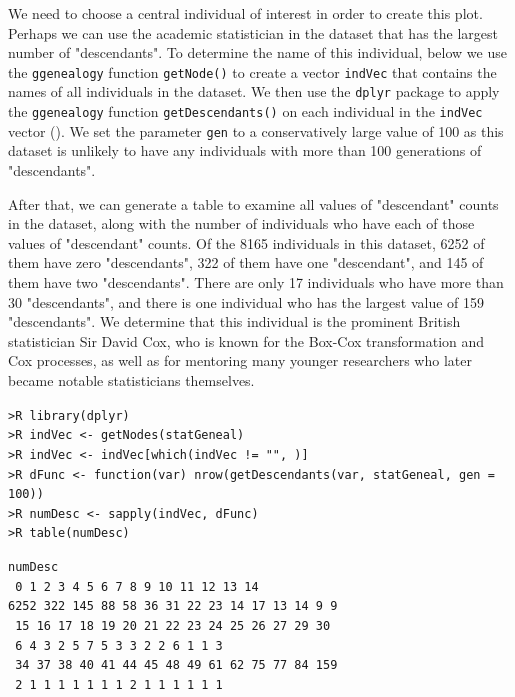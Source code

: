 \documentclass[11pt,a4paper,oldfontcommands,openany]{memoir}
\DeclareRobustCommand{\mybox}[2][gray!15]{%
\begin{tcolorbox}[   %
        breakable,
        left=0pt,
        right=0pt,
        top=0pt,
        bottom=0pt,
        colback=#1,
        colframe=#1,
        width=\dimexpr\textwidth\relax, 
        enlarge left by=0mm,
        boxsep=5pt,
        arc=0pt,outer arc=0pt,
        ]
        #2
\end{tcolorbox}
}
\numberwithin{equation}{section} %
\newcommand{\code}[1]{{\texttt{#1}}}
\newcommand{\pkg}[1]{{\texttt{#1}}}
\begin{document}
We need to choose a central individual of interest in order to create this plot. Perhaps we can use the academic statistician in the dataset that has the largest number of "descendants". To determine the name of this individual, below we use the \pkg{ggenealogy} function \code{getNode()} to create a vector \code{indVec} that contains the names of all individuals in the dataset. We then use the \pkg{dplyr} package to apply the \pkg{ggenealogy} function \code{getDescendants()} on each individual in the \code{indVec} vector (\citealt{dplyr}). We set the parameter \code{gen} to a conservatively large value of 100 as this dataset is unlikely to have any individuals with more than 100 generations of "descendants".

After that, we can generate a table to examine all values of "descendant" counts in the dataset, along with the number of individuals who have each of those values of "descendant" counts. Of the 8165 individuals in this dataset, 6252 of them have zero "descendants", 322 of them have one "descendant", and 145 of them have two "descendants". There are only 17 individuals who have more than 30 "descendants", and there is one individual who has the largest value of 159 "descendants". We determine that this individual is the prominent British statistician Sir David Cox, who is known for the Box-Cox transformation and Cox processes, as well as for mentoring many younger researchers who later became notable statisticians themselves.

\mybox{
\texttt{>R library(dplyr)}\\
\texttt{>R indVec <- getNodes(statGeneal)}\\
\texttt{>R indVec <- indVec[which(indVec != "", )]}\\
\texttt{>R dFunc <- function(var) nrow(getDescendants(var, statGeneal, gen = 100))}\\
\texttt{>R numDesc <- sapply(indVec, dFunc)}\\
\texttt{>R table(numDesc)}
}

\mybox[green!10]{
\texttt{numDesc}\\
\texttt{   0    1    2    3    4    5    6    7    8    9   10   11   12   13   14 }\\
\texttt{6252  322  145   88   58   36   31   22   23   14   17   13   14    9    9 }\\
\texttt{  15   16   17   18   19   20   21   22   23   24   25   26   27   29   30 }\\
\texttt{   6    4    3    2    5    7    5    3    3    2    2    6    1    1    3 }\\
\texttt{  34   37   38   40   41   44   45   48   49   61   62   75   77   84  159 }\\
\texttt{   2    1    1    1    1    1    1    1    2    1    1    1    1    1    1 }
}
\end{document}

